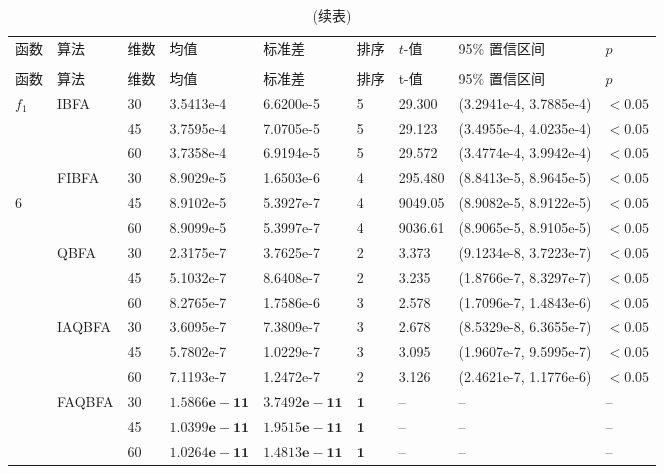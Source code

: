 \begin{longtable}[H]{p{0.3cm}p{1.2cm}p{0.3cm}p{2.45cm}p{2.45cm}p{0.5cm}p{1.2cm}p{4.5cm}p{1.5cm}}
\caption{$f_1-f_{7}$ 函数在不同维度下平均运行30次下均值和标准差\label{TableDifBFA}}
\vspace{0.5em}\\
        \hline
        函数  &  算法 & 维数	&   均值    &   标准差 & 排序&  $t$-值 &  95\% 置信区间 &  $p$   \\
        \hline
    \endfirsthead
        \caption{(续表)}\\
        \hline
         函数  &  算法 & 维数	&   均值    &   标准差 & 排序&  t-值 &  95\% 置信区间 &  $p$   \\
        \hline
    \endhead
        \hline
    \endfoot
        \hline
    \endlastfoot
$f_{1}$ &IBFA &30 &3.5413e-4 &6.6200e-5&5 &29.300 &(3.2941e-4, 3.7885e-4) & $<0.05$ \\
             & &45 &3.7595e-4 &7.0705e-5 &5 &29.123 &(3.4955e-4, 4.0235e-4) &$<0.05$  \\
             & &60 &3.7358e-4 &6.9194e-5 & 5&29.572 &(3.4774e-4, 3.9942e-4) &$<0.05$ \\
 &FIBFA &30 &8.9029e-5 &1.6503e-6& 4 &295.480 &(8.8413e-5, 8.9645e-5) &$<0.05$  \\6
             & &45 &8.9102e-5 &5.3927e-7 &4 &9049.05 &(8.9082e-5, 8.9122e-5) &$<0.05$  \\
             & &60 &8.9099e-5 &5.3997e-7 &4 &9036.61 &(8.9065e-5, 8.9105e-5) &$<0.05$  \\
 &QBFA &30 & 2.3175e-7 &3.7625e-7 &2  &3.373 &(9.1234e-8, 3.7223e-7) &$<0.05$\\
             & &45 &5.1032e-7  &8.6408e-7  &2  &3.235 &(1.8766e-7, 8.3297e-7) &$<0.05$\\
             & &60 &8.2765e-7 & 1.7586e-6 & 3 &2.578  &(1.7096e-7, 1.4843e-6) &$<0.05$\\
 &IAQBFA &30 &3.6095e-7 &7.3809e-7& 3&2.678 &(8.5329e-8, 6.3655e-7) &$<0.05$  \\
             & &45 &5.7802e-7 &1.0229e-7 &3&3.095 &(1.9607e-7, 9.5995e-7) &$<0.05$  \\
             & &60 &7.1193e-7 &1.2472e-7 & 2&3.126 &(2.4621e-7, 1.1776e-6) &$<0.05$  \\
 &FAQBFA &30 & $\bm{1.5866e-11}$ &$\bm{3.7492e-11}$ & $\bm{1}$&-- &-- &--  \\
             & &45 & $\bm{1.0399e-11}$ &$\bm{1.9515e-11}$  &$\bm{1}$ &-- &-- &--  \\
             & &60 & $\bm{1.0264e-11}$ & $\bm{1.4813e-11}$ & $\bm{1}$&-- &-- &--  \\

\end{longtable}
